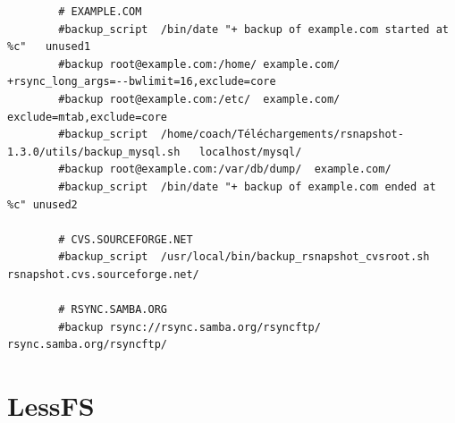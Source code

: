 \documentclass[a4paper]{report}
\begin{document}
\begin{lstlisting}
		# EXAMPLE.COM
		#backup_script	/bin/date "+ backup of example.com started at %c"	unused1
		#backup	root@example.com:/home/	example.com/	+rsync_long_args=--bwlimit=16,exclude=core
		#backup	root@example.com:/etc/	example.com/	exclude=mtab,exclude=core
		#backup_script	/home/coach/Téléchargements/rsnapshot-1.3.0/utils/backup_mysql.sh	localhost/mysql/
		#backup	root@example.com:/var/db/dump/	example.com/
		#backup_script	/bin/date "+ backup of example.com ended at %c"	unused2

		# CVS.SOURCEFORGE.NET
		#backup_script	/usr/local/bin/backup_rsnapshot_cvsroot.sh	rsnapshot.cvs.sourceforge.net/

		# RSYNC.SAMBA.ORG
		#backup	rsync://rsync.samba.org/rsyncftp/	rsync.samba.org/rsyncftp/
	\end{lstlisting}
\section{LessFS}
\end{document}
